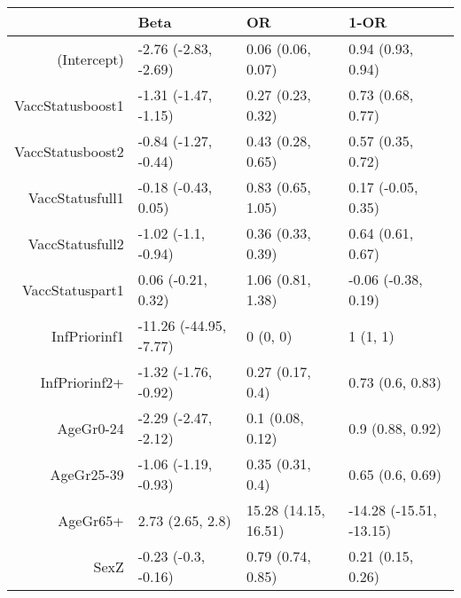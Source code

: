 \begin{table}[ht]
\centering
\begin{tabular}{rlll}
  \hline
 & Beta & OR & 1-OR \\ 
  \hline
(Intercept) & -2.76 (-2.83, -2.69) & 0.06 (0.06, 0.07) & 0.94 (0.93, 0.94) \\ 
  VaccStatusboost1 & -1.31 (-1.47, -1.15) & 0.27 (0.23, 0.32) & 0.73 (0.68, 0.77) \\ 
  VaccStatusboost2 & -0.84 (-1.27, -0.44) & 0.43 (0.28, 0.65) & 0.57 (0.35, 0.72) \\ 
  VaccStatusfull1 & -0.18 (-0.43, 0.05) & 0.83 (0.65, 1.05) & 0.17 (-0.05, 0.35) \\ 
  VaccStatusfull2 & -1.02 (-1.1, -0.94) & 0.36 (0.33, 0.39) & 0.64 (0.61, 0.67) \\ 
  VaccStatuspart1 & 0.06 (-0.21, 0.32) & 1.06 (0.81, 1.38) & -0.06 (-0.38, 0.19) \\ 
  InfPriorinf1 & -11.26 (-44.95, -7.77) & 0 (0, 0) & 1 (1, 1) \\ 
  InfPriorinf2+ & -1.32 (-1.76, -0.92) & 0.27 (0.17, 0.4) & 0.73 (0.6, 0.83) \\ 
  AgeGr0-24 & -2.29 (-2.47, -2.12) & 0.1 (0.08, 0.12) & 0.9 (0.88, 0.92) \\ 
  AgeGr25-39 & -1.06 (-1.19, -0.93) & 0.35 (0.31, 0.4) & 0.65 (0.6, 0.69) \\ 
  AgeGr65+ & 2.73 (2.65, 2.8) & 15.28 (14.15, 16.51) & -14.28 (-15.51, -13.15) \\ 
  SexZ & -0.23 (-0.3, -0.16) & 0.79 (0.74, 0.85) & 0.21 (0.15, 0.26) \\ 
   \hline
\end{tabular}
\end{table}
